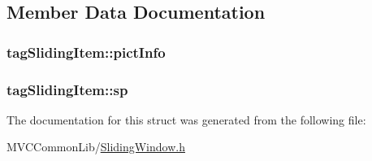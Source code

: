 \subsection{Member Data Documentation}
\hypertarget{structtag_sliding_item_a3d1f87274664505c5fb9fe06d3cd16d3}{
\subsubsection[{pictInfo}]{ {\bf tagSlidingItem::pictInfo}}}
\label{structtag_sliding_item_a3d1f87274664505c5fb9fe06d3cd16d3}
\hypertarget{structtag_sliding_item_a56c9f0817a904f6257d5de4e28c28724}{
\subsubsection[{sp}]{ {\bf tagSlidingItem::sp}}}
\label{structtag_sliding_item_a56c9f0817a904f6257d5de4e28c28724}


The documentation for this struct was generated from the following file:\begin{DoxyCompactItemize}
\item 
MVCCommonLib/\hyperlink{_sliding_window_8h}{SlidingWindow.h}\end{DoxyCompactItemize}
